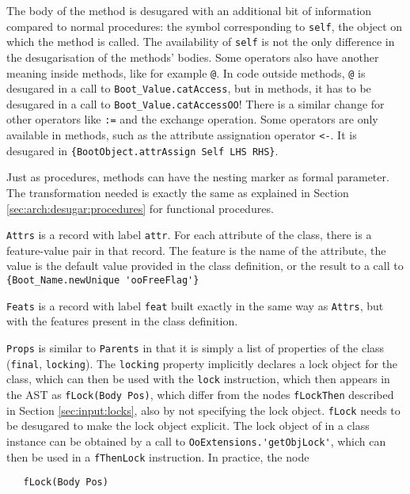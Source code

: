 \documentclass[a4paper]{memoir}
\begin{document}
The body of the method is desugared with an additional bit of information compared to normal procedures: the symbol corresponding to \lstinline!self!, the object on which the method is called. 
The availability of \lstinline!self! is not the only difference in the desugarisation of the methods' bodies. Some operators also have another meaning inside methods, like for example \lstinline!@!.
In code outside methods, \lstinline!@! is desugared in a call to
\lstinline!Boot_Value.catAccess!, but in methods, it has to be desugared in a
call to \lstinline!Boot_Value.catAccessOO!! There is a similar change for other
operators like \lstinline!:=! and the exchange operation.
Some operators are only available in methods, such as the attribute assignation
operator \lstinline!<-!. It is desugared in 
\lstinline!{BootObject.attrAssign Self LHS RHS}!.

Just as procedures, methods can have the nesting marker as formal parameter. The transformation needed
is exactly the same as explained in Section \ref{sec:arch:desugar:procedures} for functional procedures.

\lstinline!Attrs! is a record with label \lstinline!attr!.
For each attribute of the class, there is a feature-value pair in that record.
The feature is the name of the attribute, the value is the default value
provided in the class definition, or the result to a call to
\lstinline!{Boot_Name.newUnique 'ooFreeFlag'}!

\lstinline!Feats! is a record with label \lstinline!feat! built exactly in the
same way as \lstinline!Attrs!, but with the features present in the class
definition.

\lstinline!Props! is similar to \lstinline!Parents! in that it is simply a list of properties of the class (\lstinline!final!,
\lstinline!locking!). The \lstinline!locking! property implicitly declares a
lock object for the class, which can then be used with the \lstinline!lock!
instruction, which then appears in the AST as \lstinline!fLock(Body Pos)!, which
differ from the nodes \lstinline!fLockThen! described in Section
\ref{sec:input:locks}, also by not specifying the lock object. \lstinline!fLock!
needs to be desugared to make the lock object explicit. The lock object of in a
class instance can be obtained by a call to
\lstinline!OoExtensions.'getObjLock'!, which can then be used in a
\lstinline!fThenLock! instruction. In practice, the node
\label{desugar:classes:lock}
\begin{lstlisting}
   fLock(Body Pos)
\end{lstlisting}
\end{document}
